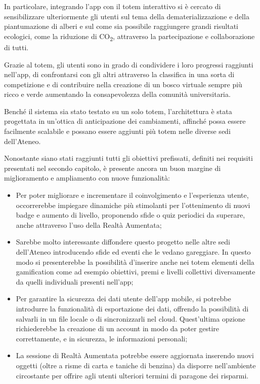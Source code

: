 In particolare, integrando l'app con il totem interattivo si è cercato di sensibilizzare ulteriormente gli utenti sul tema della dematerializzazione e della piantumazione di alberi e sul come sia possibile raggiungere grandi risultati ecologici, come la riduzione di CO\textsubscript{2}, attraverso la partecipazione e collaborazione di tutti.

Grazie al totem, gli utenti sono in grado di condividere i loro progressi raggiunti nell'app, di confrontarsi con gli altri attraverso la classifica in una sorta di competizione e di contribuire nella creazione di un bosco virtuale sempre più ricco e verde aumentando la consapevolezza della comunità universitaria.
\vspace{\baselineskip}

Benché il sistema sia stato testato su un solo totem, l’architettura è stata progettata in un’ottica di anticipazione dei cambiamenti, affinché possa essere facilmente scalabile e possano essere aggiunti più totem nelle diverse sedi dell’Ateneo.

\vspace{\baselineskip}
Nonostante siano stati raggiunti tutti gli obiettivi prefissati, definiti nei requisiti presentati nel secondo capitolo, è presente ancora un buon margine di miglioramento e ampliamento con nuove funzionalità:
\begin{itemize}
    \itemsep1em
    \item Per poter migliorare e incrementare il coinvolgimento e l'esperienza utente, occorrerebbe impiegare dinamiche più stimolanti per l'ottenimento di nuovi badge e aumento di livello, proponendo sfide o quiz periodici da superare, anche attraverso l'uso della Realtà Aumentata;
    \item Sarebbe molto interessante diffondere questo progetto nelle altre sedi dell'Ateneo introducendo sfide ed eventi che le vedano gareggiare. In questo modo si presenterebbe la possibilità d'inserire anche nei totem elementi della gamification come ad esempio obiettivi, premi e livelli collettivi diversamente da quelli individuali presenti nell'app;
    \item Per garantire la sicurezza dei dati utente dell'app mobile, si potrebbe introdurre la funzionalità di esportazione dei dati, offrendo la possibilità di salvarli in un file locale o di sincronizzarli nel cloud. Quest'ultima opzione richiederebbe la creazione di un account in modo da poter gestire correttamente, e in sicurezza, le informazioni personali;
    \item La sessione di Realtà Aumentata potrebbe essere aggiornata inserendo nuovi oggetti (oltre a risme di carta e taniche di benzina) da disporre nell'ambiente circostante per offrire agli utenti ulteriori termini di paragone dei risparmi.
\end{itemize}
